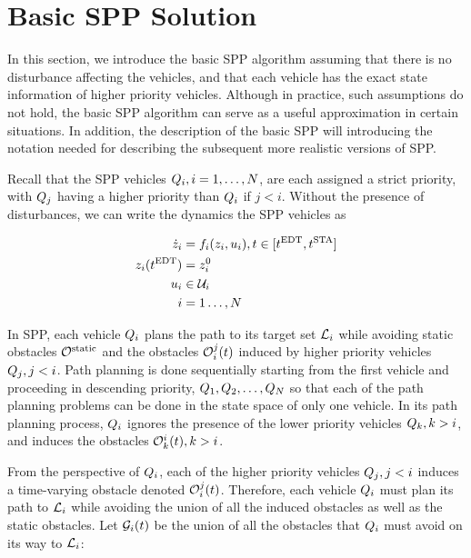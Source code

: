 \section{Basic SPP Solution\label{sec:basic}}
In this section, we introduce the basic SPP algorithm assuming that there is no disturbance affecting the vehicles, and that each vehicle has the exact state information of higher priority vehicles. Although in practice, such assumptions do not hold, the basic SPP algorithm can serve as a useful approximation in certain situations. In addition, the description of the basic SPP will introducing the notation needed for describing the subsequent more realistic versions of SPP. 

Recall that the SPP vehicles $Q_{i}, i=1,\ldots,N$, are each assigned a strict priority, with $Q_{j}$ having a higher priority than $Q_{i}$ if $j<i$. Without the presence of disturbances, we can write the dynamics the SPP vehicles as

\begin{equation}
\begin{aligned}
\dot{z}_i &= f_i(z_i, u_i), t \in [t^\text{EDT}, t^\text{STA}] \\
z_i(t^\text{EDT}) &= z^0_i \\
u_i &\in \mathcal{U}_i \\
i &= 1 \ldots, N
\end{aligned}
\end{equation}

In SPP, each vehicle $Q_{i}$ plans the path to its target set $\mathcal{L}_i$ while avoiding static obstacles $\mathcal{O}^\text{static}$ and the obstacles $\mathcal{O}_i^j(t)$ induced by higher priority vehicles $Q_{j}, j<i$. Path planning is done sequentially starting from the first vehicle and proceeding in descending priority, $Q_{1}, Q_{2}, \ldots, Q_{N}$ so that each of the path planning problems can be done in the state space of only one vehicle. In its path planning process, $Q_{i}$ ignores the presence of the lower priority vehicles $Q_{k}, k>i$, and induces the obstacles $\mathcal{O}_k^i(t), k>i$.

From the perspective of $Q_{i}$, each of the higher priority vehicles $Q_{j}, j<i$ induces a time-varying obstacle denoted $\mathcal{O}_i^j(t)$. Therefore, each vehicle $Q_{i}$ must plan its path to $\mathcal{L}_i$ while avoiding the union of all the induced obstacles as well as the static obstacles. Let $\mathcal{G}_i(t)$ be the union of all the obstacles that $Q_{i}$ must avoid on its way to $\mathcal{L}_i$:

